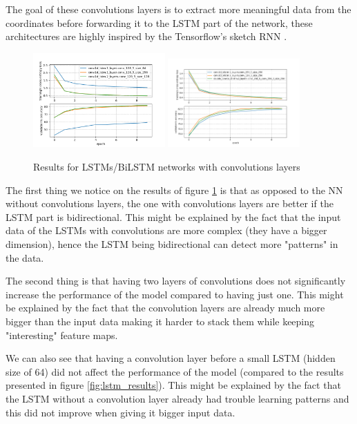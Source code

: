 \documentclass[10pt,twocolumn,letterpaper]{article}
\begin{document}
The goal of these convolutions layers is to extract more meaningful data from the coordinates before forwarding it to the LSTM part of the network, these architectures are highly inspired by the Tensorflow's sketch RNN \cite{TensorflowTutorial}.

\begin{figure}[h] 
\centering
\includegraphics[width=0.45\textwidth]{images/conv_lstm_results.png}
\includegraphics[width=0.45\textwidth]{images/conv_bilstm_results.png}
\caption{Results for LSTMs/BiLSTM networks with convolutions layers}
\label{fig:conv_lstm_results}
\end{figure}

The first thing we notice on the results of figure \ref{fig:conv_lstm_results} is that as opposed to the NN without convolutions layers, the one with convolutions layers are better if the LSTM part is bidirectional. This might be explained by the fact that the input data of the LSTMs with convolutions are more complex (they have a bigger dimension), hence the LSTM being bidirectional can detect more "patterns" in the data.

The second thing is that having two layers of convolutions does not significantly increase the performance of the model compared to having just one. This might be explained by the fact that the convolution layers are already much more bigger than the input data making it harder to stack them while keeping "interesting" feature maps.

We can also see that having a convolution layer before a small LSTM (hidden size of 64) did not affect the performance of the model (compared to the results presented in figure \ref{fig:lstm_results}). This might be explained by the fact that the LSTM without a convolution layer already had trouble learning patterns and this did not improve when giving it bigger input data.
\end{document}

